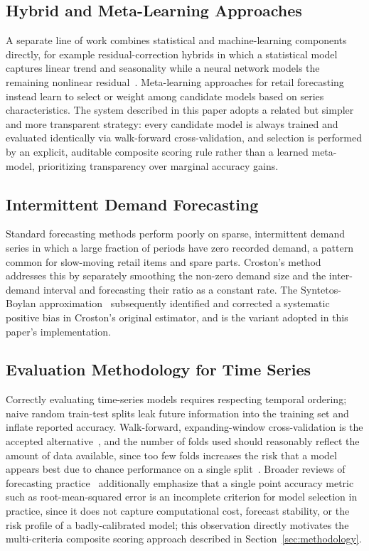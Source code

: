 \subsection{Hybrid and Meta-Learning Approaches}
A separate line of work combines statistical and machine-learning components directly, for example residual-correction hybrids in which a statistical model captures linear trend and seasonality while a neural network models the remaining nonlinear residual~\cite{zhang2003hybrid}. Meta-learning approaches for retail forecasting~\cite{ma2021metalearning} instead learn to select or weight among candidate models based on series characteristics. The system described in this paper adopts a related but simpler and more transparent strategy: every candidate model is always trained and evaluated identically via walk-forward cross-validation, and selection is performed by an explicit, auditable composite scoring rule rather than a learned meta-model, prioritizing transparency over marginal accuracy gains.

\subsection{Intermittent Demand Forecasting}
Standard forecasting methods perform poorly on sparse, intermittent demand series in which a large fraction of periods have zero recorded demand, a pattern common for slow-moving retail items and spare parts. Croston's method~\cite{croston1972} addresses this by separately smoothing the non-zero demand size and the inter-demand interval and forecasting their ratio as a constant rate. The Syntetos-Boylan approximation~\cite{syntetos2005sba} subsequently identified and corrected a systematic positive bias in Croston's original estimator, and is the variant adopted in this paper's implementation.

\subsection{Evaluation Methodology for Time Series}
Correctly evaluating time-series models requires respecting temporal ordering; naive random train-test splits leak future information into the training set and inflate reported accuracy. Walk-forward, expanding-window cross-validation is the accepted alternative~\cite{bergmeir2012cv}, and the number of folds used should reasonably reflect the amount of data available, since too few folds increases the risk that a model appears best due to chance performance on a single split~\cite{januschowski2020criteria}. Broader reviews of forecasting practice~\cite{petropoulos2022forecasting} additionally emphasize that a single point accuracy metric such as root-mean-squared error is an incomplete criterion for model selection in practice, since it does not capture computational cost, forecast stability, or the risk profile of a badly-calibrated model; this observation directly motivates the multi-criteria composite scoring approach described in Section~\ref{sec:methodology}.

